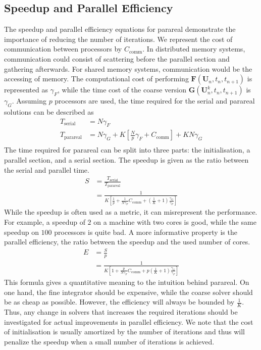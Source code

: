 \subsection{Speedup and Parallel Efficiency}
The speedup and parallel efficiency equations for parareal demonstrate the importance of reducing the number of iterations. We represent the cost of communication between processors by $C_\mathrm{comm}$. In distributed memory systems, communication could consist of scattering before the parallel section and gathering afterwards. For shared memory systems, communication would be the accessing of memory.
The computational cost of performing $\textbf{F}(\textbf{U}_n, t_n, t_{n+1})$ is represented as $\gamma_F$, while the time cost of the coarse version $\textbf{G}(\textbf{U}_n^k, t_n, t_{n+1})$ is $\gamma_G$. Assuming $p$ processors are used, the time required for the serial and parareal solutions can be described as
\begin{equation}
\begin{split}
    T_{\mathrm{serial}} &= N \gamma_F\\
    T_{\mathrm{parareal}} &= N \gamma_G + K\left[\frac{N}{p}\gamma_F + C_\mathrm{comm}\right] + K N \gamma_G\\
\end{split}
\end{equation}
The time required for parareal can be split into three parts: the initialisation, a parallel section, and a serial section. 
The speedup is given as the ratio between the serial and parallel time.
\begin{equation}
\begin{split}
\label{eq: speedup}
    S &= \frac{T_{\mathrm{serial}}}{T_{\mathrm{parareal}}}\\
     &= \frac{1}{K \left[\frac{1}{p} + \frac{1}{N \gamma_F} C_\mathrm{comm} + (\frac{1}{K} + 1)\frac{\gamma_G}{\gamma_F}\right]}
\end{split}
\end{equation}
While the speedup is often used as a metric, it can misrepresent the performance. For example, a speedup of $2$ on a machine with two cores is good, while the same speedup on $100$ processors is quite bad. A more informative property is the parallel efficiency, the ratio between the speedup and the used number of cores. 
\begin{equation}
\begin{split}
\label{eq: parallel efficiency}
   E &= \frac{S}{p}\\
    &= \frac{1}{K\left[1+\frac{p}{N \gamma_F} C_\mathrm{comm} + p(\frac{1}{K} + 1)\frac{\gamma_G}{\gamma_F}\right]}
\end{split}
\end{equation}
This formula gives a quantitative meaning to the intuition behind parareal. On one hand, the fine integrator should be expensive, while the coarse solver should be as cheap as possible. However, the efficiency will always be bounded by $\frac{1}{K}$. Thus, any change in solvers that increases the required iterations should be investigated for actual improvements in parallel efficiency. We note that the cost of initialisation is usually amortized by the number of iterations and thus will penalize the speedup when a small number of iterations is achieved.


